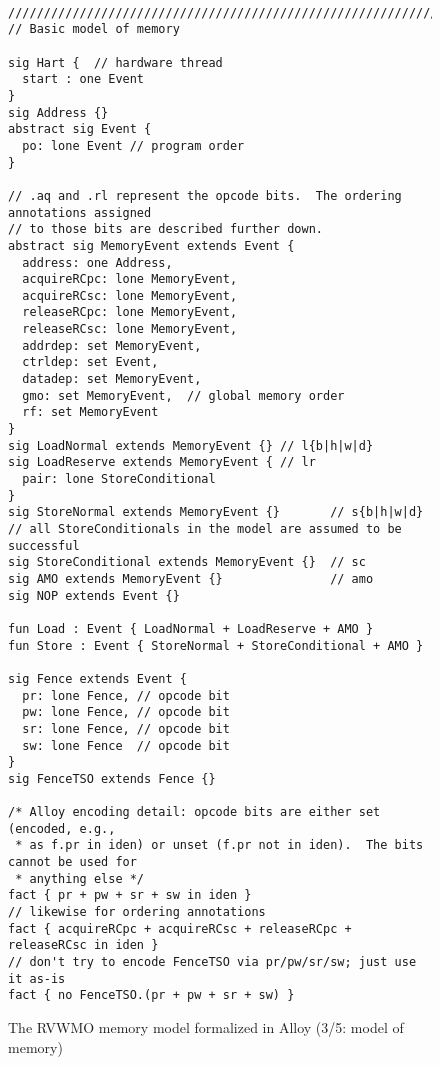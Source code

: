 \begin{figure}[h!]
  {
  \tt\bfseries\centering\footnotesize
  \begin{lstlisting}
////////////////////////////////////////////////////////////////////////////////
// Basic model of memory

sig Hart {  // hardware thread
  start : one Event
}
sig Address {}
abstract sig Event {
  po: lone Event // program order
}

// .aq and .rl represent the opcode bits.  The ordering annotations assigned
// to those bits are described further down.
abstract sig MemoryEvent extends Event {
  address: one Address,
  acquireRCpc: lone MemoryEvent,
  acquireRCsc: lone MemoryEvent,
  releaseRCpc: lone MemoryEvent,
  releaseRCsc: lone MemoryEvent,
  addrdep: set MemoryEvent,
  ctrldep: set Event,
  datadep: set MemoryEvent,
  gmo: set MemoryEvent,  // global memory order
  rf: set MemoryEvent
}
sig LoadNormal extends MemoryEvent {} // l{b|h|w|d}
sig LoadReserve extends MemoryEvent { // lr
  pair: lone StoreConditional
}
sig StoreNormal extends MemoryEvent {}       // s{b|h|w|d}
// all StoreConditionals in the model are assumed to be successful
sig StoreConditional extends MemoryEvent {}  // sc
sig AMO extends MemoryEvent {}               // amo
sig NOP extends Event {}

fun Load : Event { LoadNormal + LoadReserve + AMO }
fun Store : Event { StoreNormal + StoreConditional + AMO }

sig Fence extends Event {
  pr: lone Fence, // opcode bit
  pw: lone Fence, // opcode bit
  sr: lone Fence, // opcode bit
  sw: lone Fence  // opcode bit
}
sig FenceTSO extends Fence {}

/* Alloy encoding detail: opcode bits are either set (encoded, e.g.,
 * as f.pr in iden) or unset (f.pr not in iden).  The bits cannot be used for
 * anything else */
fact { pr + pw + sr + sw in iden }
// likewise for ordering annotations
fact { acquireRCpc + acquireRCsc + releaseRCpc + releaseRCsc in iden }
// don't try to encode FenceTSO via pr/pw/sr/sw; just use it as-is
fact { no FenceTSO.(pr + pw + sr + sw) }
\end{lstlisting}}
  \caption{The RVWMO memory model formalized in Alloy (3/5: model of memory)}
  \label{fig:alloy3}
\end{figure}

